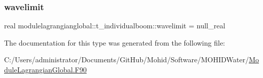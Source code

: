 \mbox{\label{structmodulelagrangianglobal_1_1t__individualboom_a9fa57c768a1554f4a7ebb1958625e963}} 
\subsubsection{\texorpdfstring{wavelimit}{wavelimit}}
{\footnotesize\ttfamily real modulelagrangianglobal\+::t\+\_\+individualboom\+::wavelimit = null\+\_\+real\hspace{0.3cm}{\ttfamily [private]}}



The documentation for this type was generated from the following file\+:\begin{DoxyCompactItemize}
\item 
C\+:/\+Users/administrator/\+Documents/\+Git\+Hub/\+Mohid/\+Software/\+M\+O\+H\+I\+D\+Water/\mbox{\hyperlink{_module_lagrangian_global_8_f90}{Module\+Lagrangian\+Global.\+F90}}\end{DoxyCompactItemize}
